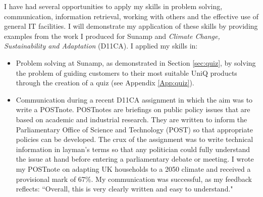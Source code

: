 I have had several opportunities to apply my skills in problem solving, communication, information retrieval, working with others and the effective use of general IT facilities.
I will demonstrate my application of these skills by providing examples from the work I produced for Sunamp and \textit{Climate Change, Sustainability and Adaptation} (D11CA).
I applied my skills in:
\begin{itemize}
    \item Problem solving at Sunamp, as demonstrated in Section \ref{sec:quiz}, by solving the problem of guiding customers to their most suitable UniQ products through the creation of a quiz (see Appendix \ref{App:quiz}).
    
    \item Communication during a recent D11CA assignment in which the aim was to write a POSTnote.
    POSTnotes are briefings on public policy issues that are based on academic and industrial research.
    They are written to inform the Parliamentary Office of Science and Technology (POST) so that appropriate policies can be developed.
	The crux of the assignment was to write technical information in layman's terms so that any politician could fully understand the issue at hand before entering a parliamentary debate or meeting.
	I wrote my POSTnote on adapting UK households to a 2050 climate and received a provisional mark of 67\%.
	My communication was successful, as my feedback reflects:
	``Overall, this is very clearly written and easy to understand."
    

\end{itemize}
